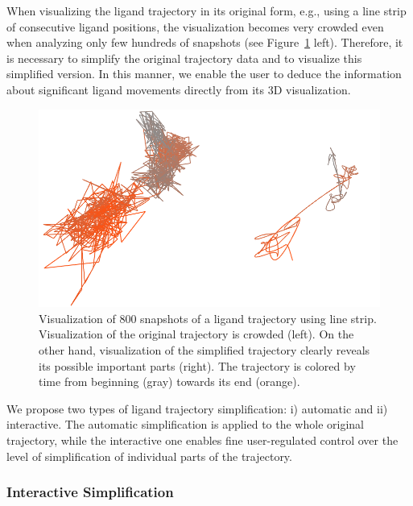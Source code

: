 When visualizing the ligand trajectory in its original form, e.g., using a line strip of consecutive ligand positions, the visualization becomes very crowded even when analyzing only few hundreds of snapshots (see Figure~\ref{fig:crowded} left).
Therefore, it is necessary to simplify the original trajectory data and to visualize this simplified version.
In this manner, we enable the user to deduce the information about significant ligand movements directly from its 3D visualization.

\begin{figure}
	\includegraphics[width=0.95\linewidth]{img/crowded-combined.png}
\caption{Visualization of 800 snapshots of a ligand trajectory using line strip.
Visualization of the original trajectory is crowded (left).
On the other hand, visualization of the simplified trajectory clearly reveals its possible important parts (right).
The trajectory is colored by time from beginning (gray) towards its end (orange).}
\label{fig:crowded}
\end{figure}

We propose two types of ligand trajectory simplification: i) automatic and ii) interactive.
The automatic simplification is applied to the whole original trajectory, while the interactive one enables fine user-regulated control over the level of simplification of individual parts of the trajectory.
\subsubsection*{Interactive Simplification}

